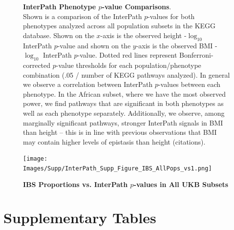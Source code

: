 \documentclass[12pt, a4paper]{article}
\begin{document}
\begin{figure}[htbp]
\caption[TBD]{\textbf{InterPath Phenotype $p$-value Comparisons}. \\ Shown is a comparison of the InterPath $p$-values for both phenotypes analyzed across all population subsets in the KEGG database. Shown on the $x$-axis is the observed height -$\log_{10}$ InterPath $p$-value and shown on the $y$-axis is the observed BMI -$\log_{10}$ InterPath $p$-value. Dotted red lines represent Bonferroni-corrected $p$-value thresholds for each population/phenotype combination (.05 / number of KEGG pathways analyzed). In general we observe a correlation between InterPath $p$-values between each phenotype. In the African subset, where we have the most observed power, we find pathways that are significant in both phenotypes as well as each phenotype separately. Additionally, we observe, among marginally significant pathways, stronger InterPath signals in BMI than height -- this is in line with previous observations that BMI may contain higher levels of epistasis than height (citations).}
\label{InterPath-Suppl-Figure-PhenoCompDotPlots}
\end{figure}

\begin{figure}[htbp]
\centering
\texttt{[image: Images/Supp/InterPath\_Supp\_Figure\_IBS\_AllPops\_vs1.png]}
\caption[TBD]{\textbf{IBS Proportions vs. InterPath $p$-values in All UKB Subsets}}
\label{InterPath-Supp-Figure-IBS-AllPops}
\end{figure}

\section{Supplementary Tables}\label{Supplementary-Tables}




\begingroup


\endgroup
\end{document}
